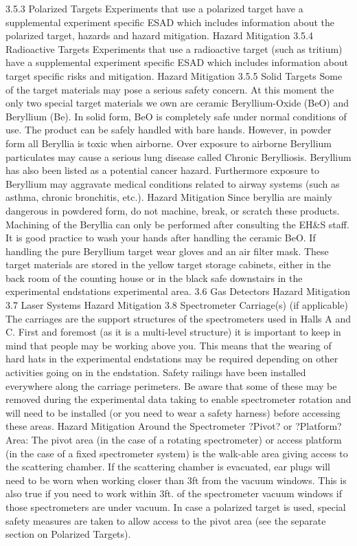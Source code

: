 {3.5.3	Polarized Targets
	Experiments that use a polarized target have a supplemental experiment specific ESAD
which includes information about the polarized target, hazards and hazard mitigation.
Hazard Mitigation
3.5.4	Radioactive Targets 
	Experiments that use a radioactive target (such as tritium) have a supplemental experiment specific ESAD which includes information about target specific risks and mitigation.
Hazard Mitigation
3.5.5	Solid Targets
	Some of the target materials may pose a serious safety concern. At this moment the only two special target materials we own are ceramic Beryllium-Oxide (BeO) and Beryllium (Be). In solid form, BeO is completely safe under normal conditions of use. The product can be safely handled with bare hands. However, in powder form all Beryllia is toxic when airborne. Over exposure to airborne Beryllium particulates may cause a serious lung disease called Chronic Berylliosis. Beryllium has also been listed as a potential cancer hazard. Furthermore exposure to Beryllium may aggravate medical conditions related to airway systems (such as asthma, chronic bronchitis, etc.). 
Hazard Mitigation
	Since beryllia are mainly dangerous in powdered form, do not machine, break, or scratch these products. Machining of the Beryllia can only be performed after consulting the EH\&S staff. It is good practice to wash your hands after handling the ceramic BeO. If handling the pure Beryllium target wear gloves and an air filter mask. These target materials are stored in the yellow target storage cabinets, either in the back room of the counting house or in the black safe downstairs in the experimental endstations experimental area. 
3.6	Gas Detectors
Hazard Mitigation
3.7	Laser Systems
Hazard Mitigation
3.8 	Spectrometer Carriage(s) (if applicable)
	The carriages are the support structures of the spectrometers used in Halls A and C. First and foremost (as it is a multi-level structure) it is important to keep in mind that people may be working above you. This means that the wearing of hard hats in the experimental endstations may be required depending on other activities going on in the endstation. Safety railings have been installed everywhere along the carriage perimeters. Be aware that some of these may be removed during the experimental data taking to enable spectrometer rotation and will need to be installed (or you need to wear a safety harness) before accessing these areas.
Hazard Mitigation
	Around the Spectrometer ?Pivot? or ?Platform? Area: The pivot area (in the case of a rotating spectrometer) or access platform (in the case of a fixed spectrometer system) is the walk-able area giving access to the scattering chamber. If the scattering chamber is evacuated, ear plugs will need to be worn when working closer than 3ft from the vacuum windows. This is also true if you need to work within 3ft. of the spectrometer vacuum windows if those spectrometers are under vacuum. In case a polarized target is used, special safety measures are taken to allow access to the pivot area (see the separate section on Polarized Targets).
}
